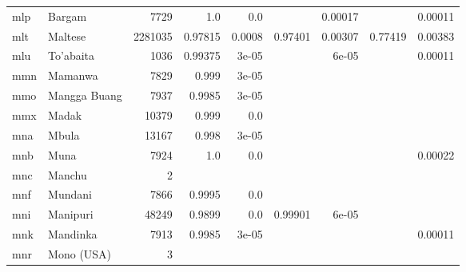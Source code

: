 \documentclass[11pt]{article}
\begin{document}
\begin{table*}[h]
{\begin{tabular}{llrrrrrrr}
mlp         & Bargam         & 7729         & 1.0         & 0.0         &          & 0.00017         &          & 0.00011         \\

mlt         & Maltese         & 2281035         & 0.97815         & 0.0008         & 0.97401         & 0.00307         & 0.77419         & 0.00383         \\

mlu         & To'abaita         & 1036         & 0.99375         & 3e-05         &          & 6e-05         &          & 0.00011         \\

mmn         & Mamanwa         & 7829         & 0.999         & 3e-05         &          &          &          &          \\

mmo         & Mangga Buang         & 7937         & 0.9985         & 3e-05         &          &          &          &          \\

mmx         & Madak         & 10379         & 0.999         & 0.0         &          &          &          &          \\

mna         & Mbula         & 13167         & 0.998         & 3e-05         &          &          &          &          \\

mnb         & Muna         & 7924         & 1.0         & 0.0         &          &          &          & 0.00022         \\

mnc         & Manchu         & 2         &          &          &          &          &          &          \\

mnf         & Mundani         & 7866         & 0.9995         & 0.0         &          &          &          &          \\

mni         & Manipuri         & 48249         & 0.9899         & 0.0         & 0.99901         & 6e-05         &          &          \\

mnk         & Mandinka         & 7913         & 0.9985         & 3e-05         &          &          &          & 0.00011         \\

mnr         & Mono (USA)         & 3         &          &          &          &          &          &          \\


\end{tabular}}
\end{table*}
\end{document}
